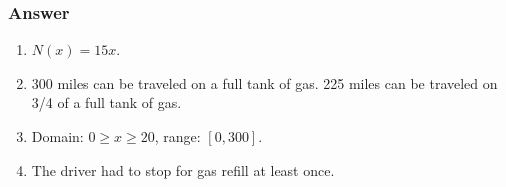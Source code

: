 \subsubsection*{Answer}

\begin{enumerate}[label = (\alph*)]
  \item
    $ N(x) = 15x $.
  \item
    300 miles can be traveled on a full tank of gas. 225 miles can be traveled on 3/4 of a full tank of gas.
  \item
    Domain: $ 0 \ge x \ge 20 $, range: $ [0, 300] $.
  \item
    The driver had to stop for gas refill at least once.

\end{enumerate}
